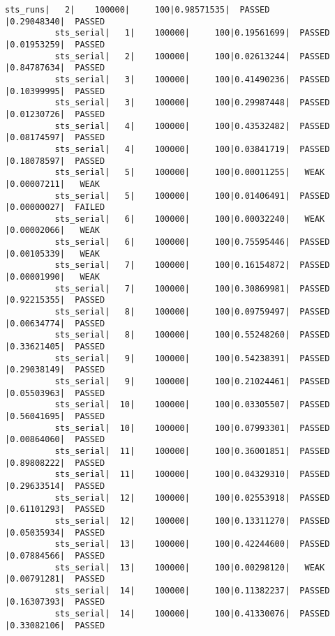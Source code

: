 \documentclass[a4paper]{article}
\begin{document}
\begin{Verbatim}[fontsize=\tiny]
            sts_runs|   2|    100000|     100|0.98571535|  PASSED          |0.29048340|  PASSED  
          sts_serial|   1|    100000|     100|0.19561699|  PASSED          |0.01953259|  PASSED  
          sts_serial|   2|    100000|     100|0.02613244|  PASSED          |0.84787634|  PASSED  
          sts_serial|   3|    100000|     100|0.41490236|  PASSED          |0.10399995|  PASSED  
          sts_serial|   3|    100000|     100|0.29987448|  PASSED          |0.01230726|  PASSED  
          sts_serial|   4|    100000|     100|0.43532482|  PASSED          |0.08174597|  PASSED  
          sts_serial|   4|    100000|     100|0.03841719|  PASSED          |0.18078597|  PASSED  
          sts_serial|   5|    100000|     100|0.00011255|   WEAK           |0.00007211|   WEAK   
          sts_serial|   5|    100000|     100|0.01406491|  PASSED          |0.00000027|  FAILED  
          sts_serial|   6|    100000|     100|0.00032240|   WEAK           |0.00002066|   WEAK   
          sts_serial|   6|    100000|     100|0.75595446|  PASSED          |0.00105339|   WEAK   
          sts_serial|   7|    100000|     100|0.16154872|  PASSED          |0.00001990|   WEAK   
          sts_serial|   7|    100000|     100|0.30869981|  PASSED          |0.92215355|  PASSED  
          sts_serial|   8|    100000|     100|0.09759497|  PASSED          |0.00634774|  PASSED  
          sts_serial|   8|    100000|     100|0.55248260|  PASSED          |0.33621405|  PASSED  
          sts_serial|   9|    100000|     100|0.54238391|  PASSED          |0.29038149|  PASSED  
          sts_serial|   9|    100000|     100|0.21024461|  PASSED          |0.05503963|  PASSED  
          sts_serial|  10|    100000|     100|0.03305507|  PASSED          |0.56041695|  PASSED  
          sts_serial|  10|    100000|     100|0.07993301|  PASSED          |0.00864060|  PASSED  
          sts_serial|  11|    100000|     100|0.36001851|  PASSED          |0.89808222|  PASSED  
          sts_serial|  11|    100000|     100|0.04329310|  PASSED          |0.29633514|  PASSED  
          sts_serial|  12|    100000|     100|0.02553918|  PASSED          |0.61101293|  PASSED  
          sts_serial|  12|    100000|     100|0.13311270|  PASSED          |0.05035934|  PASSED  
          sts_serial|  13|    100000|     100|0.42244600|  PASSED          |0.07884566|  PASSED  
          sts_serial|  13|    100000|     100|0.00298120|   WEAK           |0.00791281|  PASSED  
          sts_serial|  14|    100000|     100|0.11382237|  PASSED          |0.16307393|  PASSED  
          sts_serial|  14|    100000|     100|0.41330076|  PASSED          |0.33082106|  PASSED  

\end{Verbatim}
\end{document}
